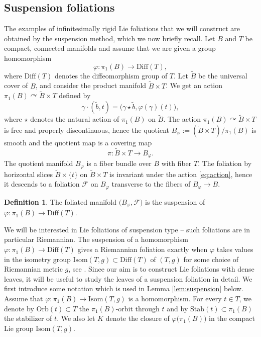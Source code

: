 \documentclass[11pt, letterpaper, oneside,reqno]{amsart}
\theoremstyle{plain}
\theoremstyle{underline}
\theoremstyle{definition}
\newtheorem{defi}[thm]{Definition}
\theoremstyle{remark}
\begin{document}
	\subsection{Suspension foliations}\label{sec:suspension}
	The examples of infinitesimally rigid Lie foliations that we will construct are obtained by the suspension method, which we now briefly recall. Let $B$ and $T$ be compact, connected manifolds and assume that we are given a group homomorphism
	\[
	\varphi:\pi_{1}(B)\rightarrow\text{Diff}(T),
	\]
	where $\text{Diff}(T)$ denotes the diffeomorphism group of $T$. Let $\widetilde{B}$ be the universal cover of $B$, and consider the product manifold $\widetilde{B}\times T$. We get an action
	$
	\pi_1(B)\curvearrowright \widetilde{B}\times T
	$
	defined by
	\begin{equation}\label{eq:action}
		\gamma\cdot(\tilde{b},t)=\big(\gamma\star\tilde{b},\varphi(\gamma)(t)\big),
	\end{equation}
	where $\star$ denotes the natural action of $\pi_1(B)$ on $\widetilde{B}$. The action $\pi_1(B)\curvearrowright \widetilde{B}\times T$ is free and properly discontinuous, hence the quotient $B_{\varphi}:=(\widetilde{B}\times T)/\pi_1(B)$ is smooth and the quotient map is a covering map
	\[
	\pi:\widetilde{B}\times T\rightarrow B_{\varphi}.
	\] 
	The quotient manifold $B_{\varphi}$ is a fiber bundle over $B$ with fiber $T$. The foliation by horizontal slices $\widetilde{B}\times \{t\}$ on $\widetilde{B}\times T$ is invariant under the action \eqref{eq:action}, hence it descends to a foliation $\mathcal{F}$ on $B_{\varphi}$ transverse to the fibers of $B_{\varphi}\rightarrow B$. 
	
	\begin{defi}
		The foliated manifold $\big(B_{\varphi},\mathcal{F}\big)$ is the suspension of $\varphi:\pi_{1}(B)\rightarrow\text{Diff}(T)$.
	\end{defi}
	
	We will be interested in Lie foliations of suspension type -- such foliations are in particular Riemannian. The suspension of a homomorphism $\varphi:\pi_{1}(B)\rightarrow\text{Diff}(T)$ gives a Riemannian foliation exactly when $\varphi$ takes values in the isometry group $\text{Isom}(T,g)\subset\text{Diff}(T)$ of $(T,g)$ for some choice of Riemannian metric $g$, see \cite[\S~3.7]{Molino}. Since our aim is to construct Lie foliations with dense leaves, it will be useful to study the leaves of a suspension foliation in detail. We first introduce some notation which is used in Lemma \ref{lem:suspension} below. Assume that $\varphi:\pi_{1}(B)\rightarrow\text{Isom}(T,g)$ is a homomorphism. For every $t\in T$, we denote by $\text{Orb}(t)\subset T$ the $\pi_{1}(B)$-orbit through $t$ and by $\text{Stab}(t)\subset\pi_{1}(B)$ the stabilizer of $t$. We also let $K$ denote the closure of $\varphi\big(\pi_{1}(B)\big)$ in the compact Lie group $\text{Isom}(T,g)$.
	
\end{document}
